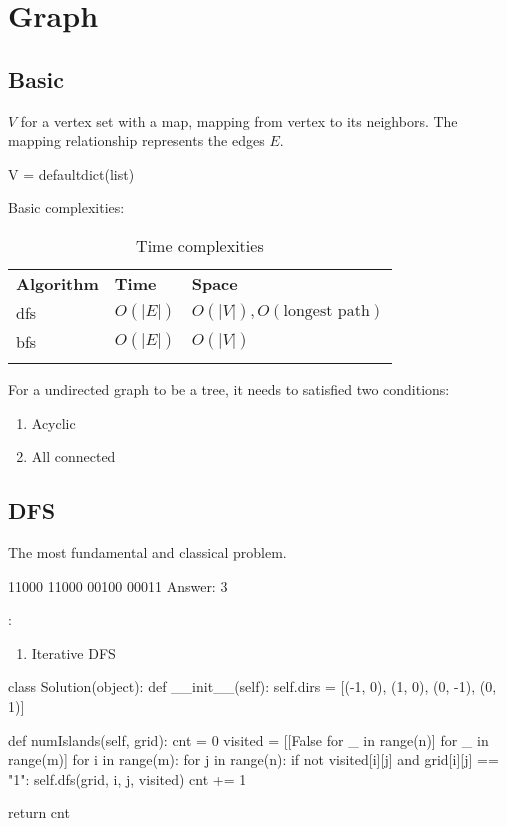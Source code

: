 \chapter{Graph}

\section{Basic}
 $V$ for a vertex set with a map, mapping from vertex to its neighbors. The mapping relationship represents the edges $E$.
\begin{python}
V = defaultdict(list)
\end{python}

 Basic complexities:

\begin{table}
\begin{tabular}{lll}
\hline\noalign{\smallskip}
\textbf{Algorithm} & \textbf{Time}  & \textbf{Space}\\
\noalign{\smallskip}\hline\noalign{\smallskip}
dfs & $O(|E|)$ & $O(|V|), O(\text{longest path})$ \\
bfs & $O(|E|)$ & $O(|V|)$ \\
\noalign{\smallskip}\hline\noalign{\smallskip}
\end{tabular}
\caption{Time complexities}
\end{table}

 For a undirected graph to be a tree, it needs to satisfied two conditions:
\begin{enumerate}
\item Acyclic
\item All connected
\end{enumerate}
\section{DFS}
 The most fundamental and classical problem.
\begin{python}
11000
11000
00100
00011
Answer: 3
\end{python}
:
\begin{enumerate}
\item Iterative DFS
\end{enumerate}
\begin{python}
class Solution(object):
  def __init__(self):
    self.dirs = [(-1, 0), (1, 0), (0, -1), (0, 1)]

  def numIslands(self, grid):
    cnt = 0
    visited = [[False for _ in range(n)]
               for _ in range(m)]
    for i in range(m):
      for j in range(n):
        if not visited[i][j] and grid[i][j] == "1":
          self.dfs(grid, i, j, visited)
          cnt += 1

    return cnt
\end{python}

